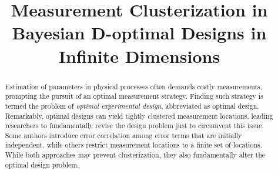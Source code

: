 \documentclass[ba]{imsart}
\theoremstyle{plain}
\theoremstyle{definition}
\theoremstyle{remark}
\providecommand{\DIFaddbegin}{} %
\providecommand{\DIFaddend}{} %
\providecommand{\DIFdelbegin}{} %
\providecommand{\DIFdelend}{} %
\newcommand{\DIFscaledelfig}{0.5}
\newlength{\DIFdelgraphicswidth} %
\newlength{\DIFdelgraphicsheight} %
\newcommand{\DIFaddincludegraphics}[2][]{{\color{blue}\fbox{\DIFOincludegraphics[#1]{#2}}}} %
\newcommand{\DIFdelincludegraphics}[2][]{%
\sbox{\DIFdelgraphicsbox}{\DIFOincludegraphics[#1]{#2}}%
\settoboxwidth{\DIFdelgraphicswidth}{\DIFdelgraphicsbox} %
\settoboxtotalheight{\DIFdelgraphicsheight}{\DIFdelgraphicsbox} %
\scalebox{\DIFscaledelfig}{%
\parbox[b]{\DIFdelgraphicswidth}{\usebox{\DIFdelgraphicsbox}\\[-\baselineskip] \rule{\DIFdelgraphicswidth}{0em}}\llap{\resizebox{\DIFdelgraphicswidth}{\DIFdelgraphicsheight}{%
\setlength{\unitlength}{\DIFdelgraphicswidth}%
\begin{picture}(1,1)%
\thicklines\linethickness{2pt} %
{\color[rgb]{1,0,0}\put(0,0){\framebox(1,1){}}}%
{\color[rgb]{1,0,0}\put(0,0){\line( 1,1){1}}}%
{\color[rgb]{1,0,0}\put(0,1){\line(1,-1){1}}}%
\end{picture}%
}\hspace*{3pt}}} %
} %
\DeclareRobustCommand{\DIFaddbegin}{\DIFOaddbegin \let\includegraphics\DIFaddincludegraphics} %
\DeclareRobustCommand{\DIFaddend}{\DIFOaddend \let\includegraphics\DIFOincludegraphics} %
\DeclareRobustCommand{\DIFdelbegin}{\DIFOdelbegin \let\includegraphics\DIFdelincludegraphics} %
\DeclareRobustCommand{\DIFdelend}{\DIFOaddend \let\includegraphics\DIFOincludegraphics} %
\begin{document}
\DIFdelbegin %

\DIFdelend \begin{frontmatter}
\title{Measurement Clusterization in Bayesian D-optimal Designs in Infinite Dimensions}



\begin{aug}
\author{ }

\DIFdelbegin %
\DIFdelend \DIFaddbegin \address[addr1]{Azrieli Faculty of Medicine, Bar-Ilan University, Safed, Israel
     }
\DIFaddend 

\end{aug}

\begin{abstract}
  Estimation of parameters in physical processes often demands costly measurements, prompting the pursuit of an optimal measurement strategy. Finding such strategy is termed the problem of \emph{optimal experimental design}, abbreviated as optimal design. Remarkably, optimal designs can yield tightly clustered measurement locations, leading researchers to fundamentally revise the design problem just to circumvent this issue. Some authors introduce error correlation among error terms that are initially independent, while others restrict measurement locations to a finite set of locations. While both approaches may prevent clusterization, they also fundamentally alter the optimal design problem.


\end{abstract}
\end{frontmatter}
\end{document}

